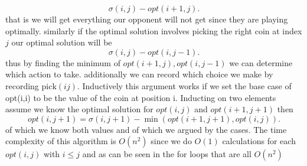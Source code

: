 \documentclass{amsart}
\begin{document}
\[
\sigma(i,j) - opt(i+1,j)
.\] 
that is we will get everything our opponent will not get since they are playing optimally.
similarly if the optimal solution involves picking the right coin at index $j$ our optimal solution will be
\[
\sigma(i,j) - opt(i,j-1)
.\] 
thus by finding the minimum of $opt(i+1,j), opt(i,j-1)$ we can
determine which action to take. additionally we can record which choice we make by recording $\text{pick}(ij)$.
Inductively this argument works if we set the base case of opt(i,i) to be the value of the coin at position i.
Inducting on two elements assume we know the optimal solution for $opt(i,j)$ and $opt(i+1,j+1)$ then 
 \[
opt(i,j+1) = \sigma(i,j+1) - \min(opt(i+1,j+1), opt(i,j))
.\] 
of which we know both values and of which we argued by the cases.
The time complexity of this algorithm is $O(n^2)$ since we do $O(1)$ calculations
for each $opt(i,j)$ with  $i \le j$ and as can be seen in the for loops that are all  $O(n^2)$
\end{document}
